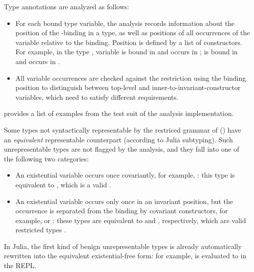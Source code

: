 Type annotations are analyzed as follows:
\begin{itemize}
  \item For each bound type variable, the analysis records information about the
    position of the -binding in a type, as well as positions of all
    occurrences of the variable relative to the binding.
    Position is defined by a list of constructors.
    For example, in the type ,
    variable  is bound in \cjl{[]} and occurs in 
    ;
     is bound in \cjl{[Tuple]} and occurs in \cjl{\{[]\}}.
  \item All variable occurrences are checked against the restriction
    using the binding position to distinguish between top-level 
    and inner-to-invariant-constructor variables, which need to satisfy
    different requirements.
\end{itemize}
 provides a list of examples from 
the test suit of the analysis implementation.

Some types not syntactically representable by the restriced grammar of \ty
()
have an \emph{equivalent} representable counterpart (according
to Julia subtyping).
Such unrepresentable types are not flagged by the analysis, and they
fall into one of the following two categories:
\begin{itemize}
  \item An existential variable occurs once covariantly, for example,
    : this type is equivalent to ,
    which is a valid \ty.
  \item An existential variable occurs only once in an invariant position, 
    but the occurrence
    is separated from the binding by covariant constructors, for example,
     or
    : these types are equivalent
    to  and
    , respectively,
    which are valid restricted types \ty.
\end{itemize}
In Julia, the first kind of benign unrepresentable types is already 
automatically rewritten into the equivalent existential-free form: for example,
 is evaluated
to  in the REPL.

